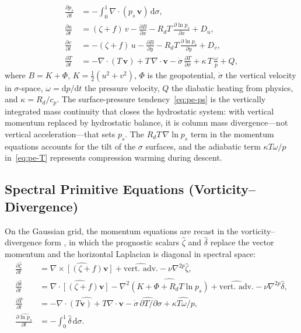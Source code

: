 \documentclass[11pt,a4paper]{article}
\newcommand{\dd}{\mathrm{d}}
\newcommand{\pp}{\partial}
\newcommand{\half}{\tfrac{1}{2}}
\newcommand{\Rd}{R_d}
\newcommand{\cpd}{c_p}
\begin{document}
\begin{align}
  \frac{\pp p_s}{\pp t} &= -\int_0^1 \nabla\!\cdot\!(p_s\,\bm v)\,\dd\sigma, \label{eq:pe-ps}\\
  \frac{\pp u}{\pp t} &= (\zeta+f)\,v - \frac{\pp B}{\pp x} - \Rd T\,\frac{\pp\ln p_s}{\pp x} + D_u, \label{eq:pe-u}\\
  \frac{\pp v}{\pp t} &= -(\zeta+f)\,u - \frac{\pp B}{\pp y} - \Rd T\,\frac{\pp\ln p_s}{\pp y} + D_v, \label{eq:pe-v}\\
  \frac{\pp T}{\pp t} &= -\nabla\!\cdot\!(T\,\bm v)+T\,\nabla\!\cdot\!\bm v - \dot\sigma\,\frac{\pp T}{\pp\sigma} + \kappa\,T\,\frac{\omega}{p} + Q, \label{eq:pe-T}
\end{align}
where $B=K+\Phi$, $K=\half(u^2+v^2)$, $\Phi$ is the geopotential, $\dot\sigma$ the vertical velocity in $\sigma$-space, $\omega=\dd p/\dd t$ the pressure velocity, $Q$ the diabatic heating from physics, and $\kappa=\Rd/\cpd$.  The surface-pressure tendency~\eqref{eq:pe-ps} is the vertically integrated mass continuity that closes the hydrostatic system: with vertical momentum replaced by hydrostatic balance, it is column mass divergence---not vertical acceleration---that sets $p_s$.  The $\Rd T\,\nabla\ln p_s$ term in the momentum equations accounts for the tilt of the $\sigma$ surfaces, and the adiabatic term $\kappa T\omega/p$ in~\eqref{eq:pe-T} represents compression warming during descent.

\subsection{Spectral Primitive Equations (Vorticity--Divergence)}

On the Gaussian grid, the momentum equations are recast in the vorticity--divergence form \citep{Bourke1972}, in which the prognostic scalars $\hat\zeta$ and $\hat\delta$ replace the vector momentum and the horizontal Laplacian is diagonal in spectral space:
\begin{align}
  \frac{\pp\hat\zeta}{\pp t} &= \widehat{\nabla\!\times\![(\zeta+f)\bm v]} + \widehat{\text{vert.\ adv.}} - \nu\nabla^{2p}\hat\zeta, \label{eq:spe-vor}\\
  \frac{\pp\hat\delta}{\pp t} &= \widehat{\nabla\!\cdot\![(\zeta+f)\bm v]} - \nabla^2\widehat{(K+\Phi+\Rd T\ln p_s)} + \widehat{\text{vert.\ adv.}} - \nu\nabla^{2p}\hat\delta, \label{eq:spe-div}\\
  \frac{\pp\hat T}{\pp t} &= \widehat{-\nabla\!\cdot\!(T\bm v)+T\nabla\!\cdot\!\bm v} - \widehat{\dot\sigma\,\pp T/\pp\sigma} + \widehat{\kappa T\omega/p}, \label{eq:spe-T}\\
  \frac{\pp\widehat{\ln p_s}}{\pp t} &= -\int_0^1\hat\delta\,\dd\sigma. \label{eq:spe-lnps}
\end{align}
\end{document}

